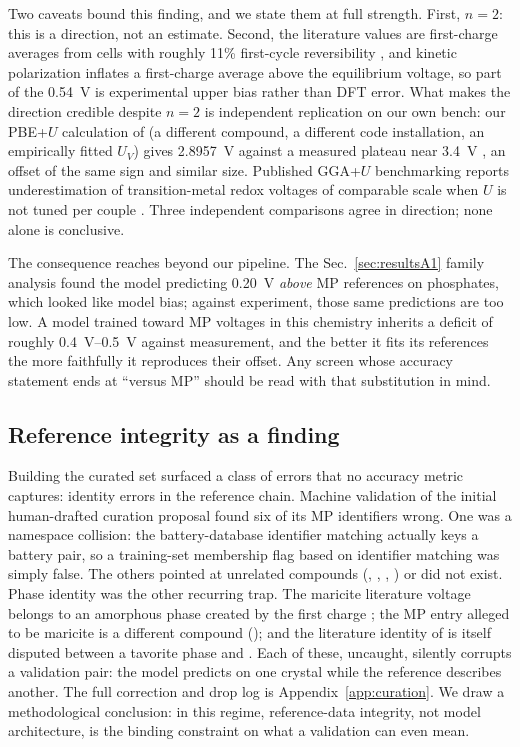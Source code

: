 \documentclass[reprint,aps,prb,amsmath,amssymb,nofootinbib,longbibliography]{revtex4-2}
\begin{document}
Two caveats bound this finding, and we state them at full strength. First,
$n=2$: this is a direction, not an estimate. Second, the 
literature values are first-charge averages from cells with roughly 11\%
first-cycle reversibility \cite{chiring2021}, and kinetic polarization
inflates a first-charge average above the equilibrium voltage, so part of
the \SI{0.54}{\volt} is experimental upper bias rather than DFT error. What
makes the direction credible despite $n=2$ is independent replication on our
own bench: our PBE+$U$ calculation of  (a different
compound, a different code installation, an empirically fitted $U_V$) gives
\SI{2.8957}{\volt} against a measured plateau near \SI{3.4}{\volt}
\cite{jian2012}, an offset of the same sign and similar size. Published
GGA+$U$ benchmarking reports underestimation of transition-metal redox
voltages of comparable scale when $U$ is not tuned per couple
\cite{wang2006,aydinol1997}. Three independent comparisons agree in
direction; none alone is conclusive.

The consequence reaches beyond our pipeline. The Sec.~\ref{sec:resultsA1}
family analysis found the model predicting \SI{+0.20}{\volt} \emph{above} MP
references on phosphates, which looked like model bias; against experiment,
those same predictions are too low. A model trained toward MP voltages in
this chemistry inherits a deficit of roughly \SIrange{0.4}{0.5}{\volt}
against measurement, and the better it fits its references the more
faithfully it reproduces their offset. Any screen whose accuracy statement
ends at ``versus MP'' should be read with that substitution in mind.

\subsection{Reference integrity as a finding}
\label{sec:resultsB2}

Building the curated set surfaced a class of errors that no accuracy metric
captures: identity errors in the reference chain. Machine validation of the
initial human-drafted curation proposal found six of its MP identifiers
wrong. One was a namespace collision: the battery-database identifier
matching  actually keys a  battery pair, so
a training-set membership flag based on identifier matching was simply false.
The others pointed at unrelated compounds (,
, , ) or did not exist. Phase
identity was the other recurring trap. The maricite  literature
voltage belongs to an amorphous phase created by the first charge
\cite{kim2015}; the MP entry alleged to be maricite  is a
different compound (); and the literature identity of
 is itself disputed between a tavorite phase and
 \cite{barker2003}. Each of these, uncaught, silently
corrupts a validation pair: the model predicts on one crystal while the
reference describes another. The full correction and drop log is
Appendix~\ref{app:curation}. We draw a methodological conclusion:
in this regime, reference-data integrity, not model architecture, is the
binding constraint on what a validation can even mean.
\end{document}
